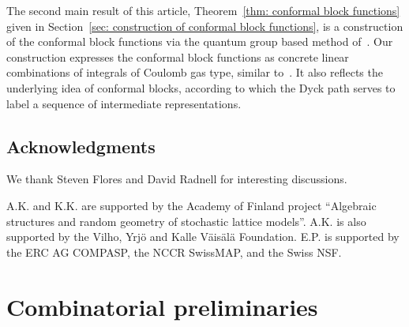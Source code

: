 \documentclass[oneside,english]{amsart}
\numberwithin{equation}{section}
\numberwithin{figure}{section}
\theoremstyle{plain}
\theoremstyle{plain}
\theoremstyle{plain}
\theoremstyle{remark}
\theoremstyle{plain}
\theoremstyle{plain}
\theoremstyle{plain}
\theoremstyle{plain}
\theoremstyle{plain}
\theoremstyle{plain}
\theoremstyle{plain}
\theoremstyle{plain}
\newcommand{\blue}[1]{{\color{blue} #1}}
\begin{document}
The second main result of this article, Theorem~\ref{thm: conformal block functions}
given in Section~\ref{sec: construction of conformal block functions},
is a construction of the conformal block functions via the quantum group based method
of~\cite{KP-conformally_covariant_boundary_correlation_functions_with_a_quantum_group}.
Our construction expresses the conformal block functions as concrete linear combinations of
integrals of Coulomb gas type, similar to~\cite{DF-multipoint_correlation_functions}. 
It also reflects the underlying idea of conformal blocks, according to which
the Dyck path serves to label a sequence of intermediate representations.





\subsection*{Acknowledgments}
We thank Steven Flores and David Radnell for interesting discussions.

A.K. and K.K. are supported by the Academy of Finland project
``Algebraic structures and random geometry of stochastic lattice models''. A.K. is also supported by the Vilho, Yrj\"{o} and Kalle V\"{a}is\"{a}l\"{a} Foundation.
E.P. is supported by the ERC AG COMPASP, the NCCR SwissMAP, and the Swiss NSF.




\bigskip

\section{Combinatorial preliminaries}
\label{sec: combinatorial preliminaries}

\end{document}
